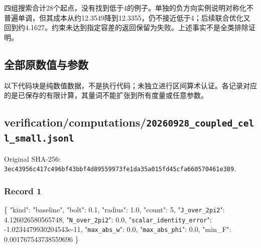 \documentclass[
  10pt,
]{article}
\newenvironment{Shaded}{}{}
\newcommand{\DataTypeTok}[1]{\textcolor[rgb]{0.56,0.13,0.00}{#1}}
\newcommand{\DecValTok}[1]{\textcolor[rgb]{0.25,0.63,0.44}{#1}}
\newcommand{\FloatTok}[1]{\textcolor[rgb]{0.25,0.63,0.44}{#1}}
\newcommand{\FunctionTok}[1]{\textcolor[rgb]{0.02,0.16,0.49}{#1}}
\newcommand{\StringTok}[1]{\textcolor[rgb]{0.25,0.44,0.63}{#1}}
\begin{document}
四组搜索合计28个起点，没有找到低于4的例子。单独的负方向实例说明对称化不普遍单调，但其成本从约12.3549降到12.3355，仍不接近低于4；后续联合优化又回到约4.1627。约束未达到指定容差的返回保留为失败。上述事实不是全类排除证明。

\hypertarget{ux5168ux90e8ux539fux6570ux503cux4e0eux53c2ux6570}{%
\subsection{全部原数值与参数}\label{ux5168ux90e8ux539fux6570ux503cux4e0eux53c2ux6570}}

以下代码块是纯数值数据，不是执行代码；未独立进行区间算术认证。各记录对应的是已保存的有限计算，其量词不能扩张到所有度量或任意参数。

\hypertarget{verificationcomputations20260928_coupled_cell_small.jsonl}{%
\subsection{verification/computations/\nolinkurl{20260928_coupled_cell_small.jsonl}}\label{verificationcomputations20260928_coupled_cell_small.jsonl}}

Original SHA-256:
\nolinkurl{3ec43956c417c496bf43bbf4d89559973fe1da35a015fd45cfa660570461e389}.

\hypertarget{record-1}{%
\subsubsection{Record 1}\label{record-1}}

\begin{Shaded}
\begin{Highlighting}[]
\FunctionTok{\{}
  \DataTypeTok{"kind"}\FunctionTok{:} \StringTok{"baseline"}\FunctionTok{,}
  \DataTypeTok{"bolt"}\FunctionTok{:} \FloatTok{0.1}\FunctionTok{,}
  \DataTypeTok{"radius"}\FunctionTok{:} \FloatTok{1.0}\FunctionTok{,}
  \DataTypeTok{"count"}\FunctionTok{:} \DecValTok{5}\FunctionTok{,}
  \DataTypeTok{"\nolinkurl{J_over_2pi2}"}\FunctionTok{:} \FloatTok{4.126026580565748}\FunctionTok{,}
  \DataTypeTok{"\nolinkurl{N_over_2pi2}"}\FunctionTok{:} \FloatTok{0.0}\FunctionTok{,}
  \DataTypeTok{"\nolinkurl{scalar_identity_error}"}\FunctionTok{:} \FloatTok{{-}1.0234479930204543e{-}11}\FunctionTok{,}
  \DataTypeTok{"\nolinkurl{max_abs_w}"}\FunctionTok{:} \FloatTok{0.0}\FunctionTok{,}
  \DataTypeTok{"\nolinkurl{max_abs_phi}"}\FunctionTok{:} \FloatTok{0.0}\FunctionTok{,}
  \DataTypeTok{"min\_F"}\FunctionTok{:} \FloatTok{0.001767543738559696}
\FunctionTok{\}}
\end{Highlighting}
\end{Shaded}
\end{document}
